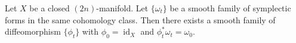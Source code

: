 

    Let $X$ be a closed $(2n)$-manifold.
    Let $\{\omega_t\}$ be a smooth family of symplectic forms in the same cohomology class.
    Then there exists a smooth family of diffeomorphism $\{\phi_t\}$ with $\phi_0=\operatorname{id}_X$ and $\phi_t^*\omega_t=\omega_0$.

